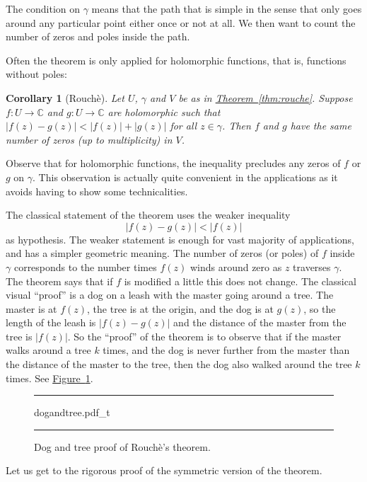 \documentclass[12pt,openany]{book}
\newcommand{\sabs}[1]{\lvert {#1} \rvert}
\newcommand{\C}{{\mathbb{C}}}
\theoremstyle{plain}
\newtheorem{cor}[thm]{Corollary}
\theoremstyle{remark}
\theoremstyle{definition}
\newenvironment{myfig}{%
\begin{figure}[h!t]
\noindent\rule{\textwidth}{0.4pt}\vspace{12pt}\par\centering}%
{\par\noindent\rule{\textwidth}{0.4pt}
\end{figure}}
\theoremstyle{exercise}
\theoremstyle{example}
\newcommand{\figureref}[1]{\hyperref[#1]{Figure~\ref*{#1}}}
\newcommand{\thmref}[1]{\hyperref[#1]{Theorem~\ref*{#1}}}
\begin{document}
The condition on $\gamma$ means that the
path that is simple in the sense
that only goes around any particular point either once or not at all.
We then want to count the number of zeros and poles inside the path.

Often the theorem is only applied for holomorphic functions, that is,
functions without poles:

\begin{cor}[Rouch\`e]\label{thm:rouche2}
Let $U$,  $\gamma$ and $V$ be as in \thmref{thm:rouche}.
Suppose $f \colon U \to \C$ and $g \colon U \to \C$
are holomorphic such that
$\sabs{f(z)-g(z)} < \sabs{f(z)}+\sabs{g(z)}$
for all $z \in \gamma$.  Then $f$ and $g$ have the same number of zeros (up
to multiplicity) in $V$.
\end{cor}

Observe that for holomorphic functions,
the inequality precludes any zeros of $f$ or
$g$ on $\gamma$.  This observation is actually quite convenient in the
applications as it avoids having to show some technicalities.

The classical statement of the theorem uses the weaker
inequality
\begin{equation*}
\sabs{f(z)-g(z)} < \sabs{f(z)}
\end{equation*}
as hypothesis.
The weaker statement is enough for vast majority of
applications, and has a simpler geometric meaning.  The number of zeros (or
poles) of $f$
inside $\gamma$ corresponds to the number times $f(z)$ winds around zero
as $z$ traverses $\gamma$.  The theorem says that if $f$ is modified a
little this does not change.  The classical visual ``proof'' is a dog on a leash
with the master going around a tree.  The master is at $f(z)$, the tree is
at the origin, and the dog is at $g(z)$, so the length of the leash is
$\sabs{f(z)-g(z)}$ and the distance of the master from the tree is
$\sabs{f(z)}$.  So the ``proof'' of the theorem is to observe that if the
master walks around a tree $k$ times, and the dog is never further from the
master than the distance of the master to the tree, then the dog also walked
around the tree $k$ times.  See \figureref{fig:dogandtree}.

\begin{myfig}
{dogandtree.pdf_t}
\caption{Dog and tree proof of Rouch\`e's theorem.\label{fig:dogandtree}}
\end{myfig}

Let us get to the rigorous proof of the symmetric version of the
theorem.
\end{document}
